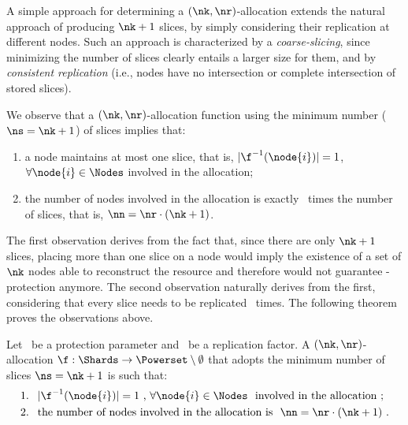 A simple approach for determining a $(\nk,\nr)$-allocation extends the
natural approach of producing $\nk+1$ slices, by simply considering
their replication at different nodes.  Such an approach is
characterized by a {\em coarse-slicing\/}, since minimizing the number
of slices clearly entails a larger size for them, and by {\em
  consistent replication} (i.e., nodes have no intersection or
complete intersection of stored slices).

We observe that a $(\nk,\nr)$-allocation function using the minimum
number ($\ns=\nk+1$) of slices implies that:

\begin{enumerate}
	\item a node maintains at most one slice, that is, 
	$|\f^{-1}(\node{i})|=1$, $\forall \node{i} \in \Nodes$ involved in the allocation;
	
	\item the number of nodes involved in the allocation is exactly 
	\nr\ times the number of slices, that is, $\nn=\nr \cdot (\nk+1)$.
\end{enumerate}

The first observation derives from the fact that, since there are only
$\nk+1$ slices, placing more than one slice on a node would imply the
existence of a set of $\nk$ nodes able to reconstruct the resource and
therefore would not guarantee \nk-protection anymore.  The second
observation naturally derives from the first, considering that every
slice needs to be replicated \nr\ times.  The following theorem proves
the observations above.

\smallskip
\begin{theorem}\label{dcs:theo:diagonal}
Let \nk\ be a protection parameter and \nr\ be a replication factor. A
$(\nk,\nr)$-allocation $\f : \Shards \rightarrow \Powerset \setminus
\emptyset$ that adopts the minimum number of slices $\ns=\nk+1$ is
such that:
\begin{align*}
    & \text{1. }\ |\f^{-1}(\node{i})|=1 \text{ , } \forall \node{i} \in \Nodes\ \text{ involved in the allocation}\ ; \\
    & \text{2. }\ \text{the number of nodes involved in the allocation is }\ \nn=\nr \cdot (\nk+1)\ . 
\end{align*}
\end{theorem}
\smallskip


